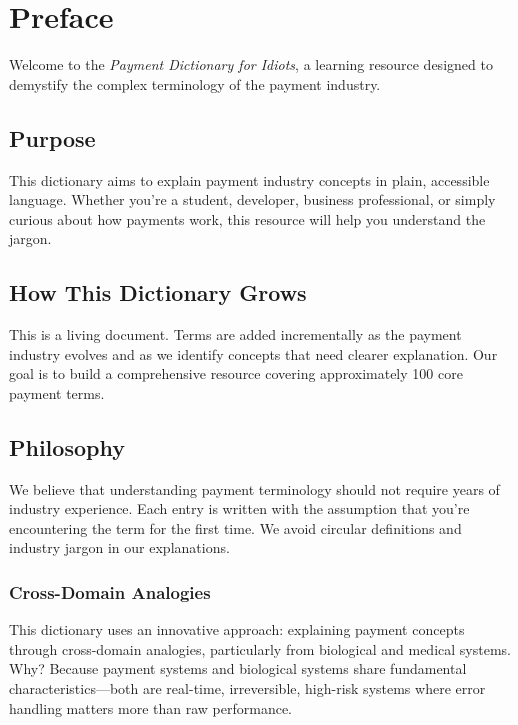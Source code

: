 \chapter*{Preface}

Welcome to the \textit{Payment Dictionary for Idiots}, a learning resource designed to demystify the complex terminology of the payment industry.

\section*{Purpose}

This dictionary aims to explain payment industry concepts in plain, accessible language. Whether you're a student, developer, business professional, or simply curious about how payments work, this resource will help you understand the jargon.

\section*{How This Dictionary Grows}

This is a living document. Terms are added incrementally as the payment industry evolves and as we identify concepts that need clearer explanation. Our goal is to build a comprehensive resource covering approximately 100 core payment terms.

\section*{Philosophy}

We believe that understanding payment terminology should not require years of industry experience. Each entry is written with the assumption that you're encountering the term for the first time. We avoid circular definitions and industry jargon in our explanations.

\subsection*{Cross-Domain Analogies}

This dictionary uses an innovative approach: explaining payment concepts through cross-domain analogies, particularly from biological and medical systems. Why? Because payment systems and biological systems share fundamental characteristics---both are real-time, irreversible, high-risk systems where error handling matters more than raw performance.

